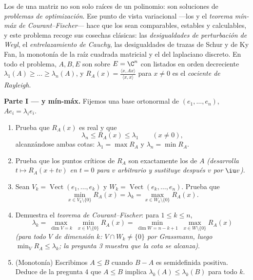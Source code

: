 \begin{problem}\label{pb:b2:hermitian:1}
Los  de una matriz  no son solo raíces de un
polinomio: son soluciones de \emph{problemas de optimización}. Ese
punto de vista variacional ---los  y el
\emph{teorema mín-máx de Courant--Fischer}--- hace que los  sean comparables,
estables y calculables, y este problema recoge sus cosechas clásicas:
las \emph{desigualdades de perturbación de Weyl}, el \emph{entrelazamiento de Cauchy}, las desigualdades de
trazas de Schur y de Ky Fan, la monotonía de la raíz cuadrada
matricial y el  del laplaciano discreto. En todo el
problema, $A, B, E$ son  sobre $E = \C^n$ con
 listados en orden decreciente $\lambda_1(A) \geq
\dots \geq \lambda_n(A)$, y $R_A(x) = \frac{\langle x, Ax\rangle}
{\langle x, x\rangle}$ para $x \neq 0$ es el \emph{cociente de
Rayleigh}.

\medskip
\noindent\textbf{Parte I ---  y mín-máx.}
Fijemos una base ortonormal de  $(e_1, \dots, e_n)$,
$Ae_i = \lambda_ie_i$.
\begin{enumerate}
  \item Prueba que $R_A(x)$ es real y que
        \[
        \lambda_n \leq R_A(x) \leq \lambda_1
        \qquad (x \neq 0),
        \]
        alcanzándose ambas cotas: $\lambda_1 = \max R_A$ y
        $\lambda_n = \min R_A$.
  \item Prueba que los puntos críticos de $R_A$ son exactamente los
         de $A$ \emph{(desarrolla $t \mapsto R_A(x +
        tv)$ en $t = 0$ para $v$ arbitrario y sustituye después $v$
        por $\iu v$)}.
  \item Sean $V_k = \operatorname{Vect}(e_1, \dots, e_k)$ y $W_k =
        \operatorname{Vect}(e_k, \dots, e_n)$. Prueba que
        \[
        \min_{x \in V_k\setminus\{0\}} R_A(x) = \lambda_k
        = \max_{x \in W_k\setminus\{0\}} R_A(x) .
        \]
  \item Demuestra el \emph{teorema de Courant--Fischer}: para $1
        \leq k \leq n$,
        \[
        \lambda_k = \max_{\dim V = k}\;\min_{x \in
        V\setminus\{0\}} R_A(x)
        = \min_{\dim W = n-k+1}\;\max_{x \in
        W\setminus\{0\}} R_A(x)
        \]
        \emph{(para todo $V$ de dimensión $k$: $V \cap W_k \neq
        \{0\}$ por Grassmann, luego $\min_V R_A \leq \lambda_k$; la
        pregunta 3 muestra que la cota se alcanza)}.
  \item (Monotonía) Escribimos $A \leq B$ cuando $B - A$ es
        semidefinida positiva. Deduce de la pregunta 4 que $A \leq
        B$ implica $\lambda_k(A) \leq \lambda_k(B)$ para todo $k$.
\end{enumerate}


\end{problem}

